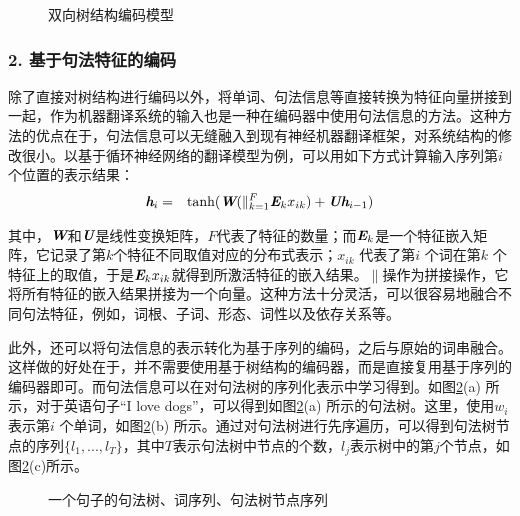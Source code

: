 \begin{figure}[htp]
\centering

\caption{双向树结构编码模型}
\label{fig:15-21}
\end{figure}


\subsubsection{2. 基于句法特征的编码}

\parinterval 除了直接对树结构进行编码以外，将单词、句法信息等直接转换为特征向量拼接到一起，作为机器翻译系统的输入也是一种在编码器中使用句法信息的方法。这种方法的优点在于，句法信息可以无缝融入到现有神经机器翻译框架，对系统结构的修改很小。以基于循环神经网络的翻译模型为例，可以用如下方式计算输入序列第$i$个位置的表示结果：
\begin{eqnarray}
\textbf{\em h}_i &=& \textrm{tanh}(\textbf{\em W}(\|_{k=1}^{F}\textbf{\em E}_k x_{ik}) + \textbf{\em U}\textbf{\em h}_{i-1})
\label{eq:15-55}
\end{eqnarray}

\noindent 其中，$\textbf{\em W}$和$\textbf{\em U}$是线性变换矩阵，$F$代表了特征的数量；而$\textbf{\em E}_k$是一个特征嵌入矩阵，它记录了第$k$个特征不同取值对应的分布式表示；$x_{ik}$ 代表了第$i$ 个词在第$k$ 个特征上的取值，于是$\textbf{\em E}_k x_{ik}$就得到所激活特征的嵌入结果。$\|$操作为拼接操作，它将所有特征的嵌入结果拼接为一个向量。这种方法十分灵活，可以很容易地融合不同句法特征，例如，词根、子词、形态、词性以及依存关系等。

\parinterval 此外，还可以将句法信息的表示转化为基于序列的编码，之后与原始的词串融合。这样做的好处在于，并不需要使用基于树结构的编码器，而是直接复用基于序列的编码器即可。而句法信息可以在对句法树的序列化表示中学习得到。如图\ref{fig:15-22}(a) 所示，对于英语句子“I love dogs”，可以得到如图\ref{fig:15-22}(a) 所示的句法树。这里，使用$w_i$ 表示第$i$ 个单词，如图\ref{fig:15-22}(b) 所示。通过对句法树进行先序遍历，可以得到句法树节点的序列$\{l_1,...,l_T\}$，其中$T$表示句法树中节点的个数，$l_j$表示树中的第$j$个节点，如图\ref{fig:15-22}(c)所示。

\begin{figure}[htp]
\centering

\caption{一个句子的句法树、词序列、句法树节点序列}
\label{fig:15-22}
\end{figure}

